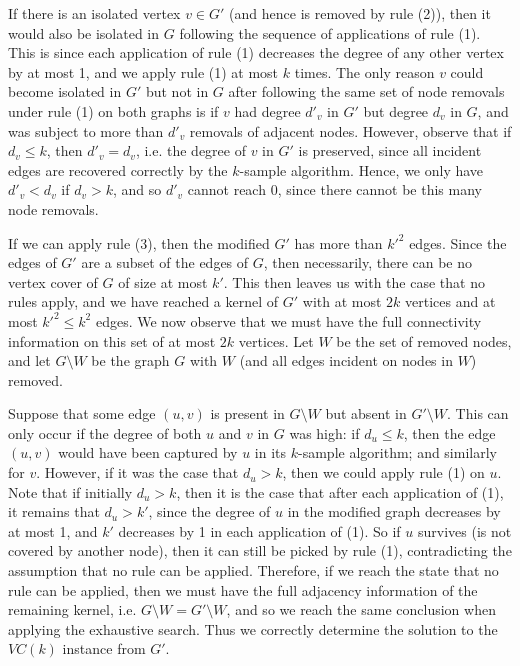 \documentclass[11pt,letter]{article}
\begin{document}
{If there is an isolated vertex $v \in G'$ (and hence is removed by rule (2)), then it would also be isolated
in $G$ following the sequence of applications of rule (1).
This is since each application of rule (1) decreases the degree of any
other vertex by at most 1, and we apply rule (1) at most $k$ times.
The only reason $v$ could become isolated in $G'$ but not in $G$ after
following the same set of node removals under rule (1) on both graphs
is if $v$ had degree $d'_v$ in $G'$ but degree $d_v$ in $G$, and was
subject to more than $d'_v$ removals of adjacent nodes.
However, observe that if $d_v \le k$, then $d'_v = d_v$, i.e. the
degree of $v$ in $G'$ is preserved, since all incident edges are
recovered correctly by the $k$-sample algorithm.
Hence, we only have $d'_v < d_v$ if $d_v > k$, and so $d'_v$ cannot
reach 0, since there cannot be this many node removals.

If we can apply rule (3), then the modified $G'$ has more than $k'^2$
edges.  Since the edges of $G'$ are a subset of the edges of $G$, then
necessarily, there can be no vertex cover of $G$ of size at most
$k'$.
This then leaves us with the case that no rules apply, and we have
reached a kernel of $G'$  with at most $2k$ vertices and at most $k'^2 \leq k^2$ edges.
We now observe that we must have the full connectivity information on
this set of at most $2k$ vertices.
Let $W$ be the set of removed nodes, and let $G \setminus W$ be the
graph $G$ with $W$ (and all edges incident on nodes in $W$) removed.

Suppose that some edge $(u,v)$ is present in $G \setminus W$ but
absent in $G' \setminus W$.
This can only occur if the degree of both $u$ and $v$ in $G$ was high:
if $d_u \le k$, then the edge $(u,v)$ would have been captured by $u$ in its
$k$-sample algorithm; and similarly for $v$.
However, if it was the case that $d_u > k$, then we could apply rule
(1) on $u$.
Note that if initially $d_u > k$, then it is the case that after each
application of (1), it remains that $d_u > k'$, since the degree of
$u$ in the modified graph decreases by at most 1, and $k'$ decreases
by 1 in each application of (1).
So if $u$ survives (is not covered by another node), then it can still
be picked by rule (1), contradicting the assumption that no rule can
be applied.
Therefore, if we reach the state that no rule can be applied, then we
must have the full adjacency information of the remaining kernel,
i.e. $G \setminus W = G'\setminus W$, and so we reach the same
conclusion when applying the exhaustive search.
Thus we correctly determine the solution to the $VC(k)$ instance from
$G'$.
}
\end{document}

